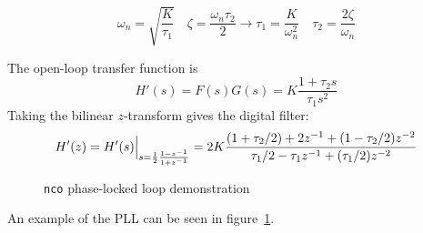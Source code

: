 \[
    \omega_n = \sqrt{\frac{K}{\tau_1}}
    \,\,\,\,\,\,
    \zeta = \frac{\omega_n \tau_2}{2}
        \rightarrow
    \tau_1 = \frac{K}{\omega_n^2}
    \,\,\,\,\,\,
    \tau_2 = \frac{2\zeta}{\omega_n}
\]

The open-loop transfer function is
\[
    H'(s) = F(s)G(s) = K \frac{1 + \tau_2 s}{\tau_1 s^2}
\]
Taking the bilinear $z$-transform gives the digital filter:
\[
    H'(z) = H'(s)\Bigl.\Bigr|_{s = \frac{1}{2}\frac{1-z^{-1}}{1+z^{-1}}}
          = 2 K \frac{
                (1+\tau_2/2) + 2 z^{-1}     + ( 1 - \tau_2/2)z^{-2}
          } {
                \tau_1/2 -\tau_1 z^{-1} + (\tau_1/2)z^{-2}
          }
\]

\begin{figure}
\centering
{}
\caption{{\tt nco} phase-locked loop demonstration}
\label{fig:module:nco:pll}
\end{figure}

An example of the PLL can be seen in figure~\ref{fig:module:nco:pll}.

